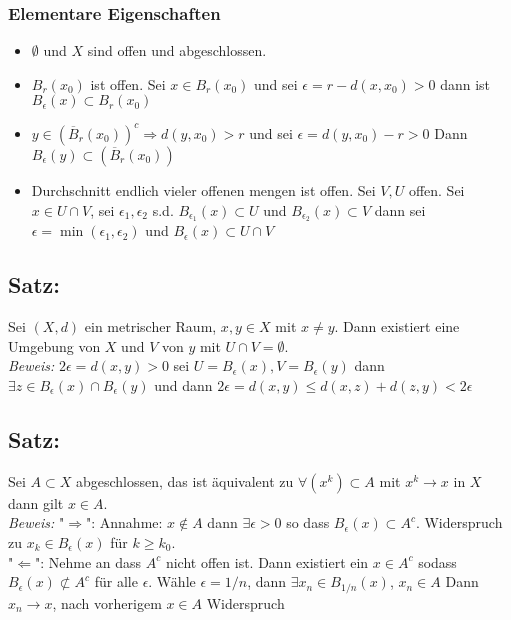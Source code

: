 \subsubsection{Elementare Eigenschaften}
\begin{itemize}
	\item $\emptyset$ und $X$ sind offen und abgeschlossen.
	\item $B_r(x_0)$ ist offen. Sei $x\in B_r(x_0)$ und sei $\epsilon = r-d(x,x_0) > 0$ dann ist $B_\epsilon(x) \subset B_r(x_0)$
	\item $y\in (\overline B_r(x_0))^c \Rightarrow d(y,x_0)>r$ und sei $\epsilon = d(y,x_0) - r > 0$ Dann $B_\epsilon(y)\subset\left(\overline B_r(x_0) \right)$
	\item Durchschnitt endlich vieler offenen mengen ist offen. Sei $V,U$ offen. Sei $x\in U\cap V$, sei $\epsilon_1,\epsilon_2$ s.d. $B_{\epsilon_1}(x) \subset U$ und $B_{\epsilon_2}(x) \subset V$ dann sei $\epsilon = \min(\epsilon_1,\epsilon_2)$ und $B_\epsilon(x) \subset U\cap V$ 
\end{itemize}

\subsection{Satz: }
Sei $(X,d)$ ein metrischer Raum, $x,y\in X$ mit $x\neq y$. Dann existiert eine Umgebung von $X$ und $V$ von $y$ mit $U\cap V = \emptyset$.\\
\textit{Beweis: } $2\epsilon = d(x,y)>0$ sei $U = B_\epsilon(x), V = B_\epsilon(y)$ dann $\exists z \in B_\epsilon(x)\cap B_\epsilon(y)$ und dann $2\epsilon = d(x,y) \leq d(x,z) + d(z,y) < 2\epsilon$ 

\subsection{Satz: }
Sei $A\subset X$ abgeschlossen, das ist äquivalent zu $\forall (x^k)\subset A$ mit $x^k\rightarrow x$ in $X$ dann gilt $x\in A$.\\
\textit{Beweis: } "$\Rightarrow$": Annahme: $x\notin A$ dann $\exists\epsilon >0$ so dass $B_\epsilon (x) \subset A^c$. Widerspruch zu $x_k\in B_\epsilon(x)$ für $k\geq k_0$.\\
"$\Leftarrow$": Nehme an dass $A^c$ nicht offen ist. Dann existiert ein $x\in A^c$ sodass $B_\epsilon (x) \not\subset A^c$ für alle $\epsilon$. Wähle $\epsilon = 1/n$, dann $\exists x_n\in B_{1/n}(x)$, $x_n \in A$ Dann $x_n\rightarrow x$, nach vorherigem $x\in A$ Widerspruch

